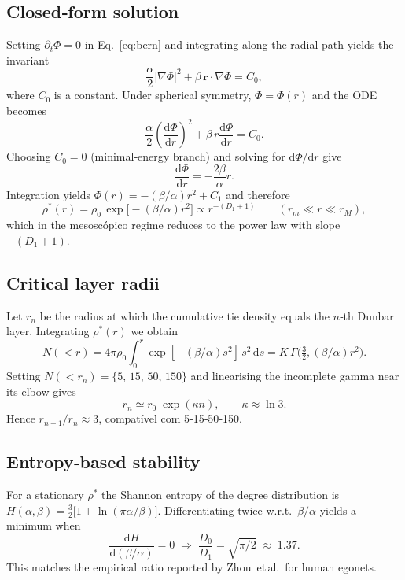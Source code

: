 \subsection{Closed‑form solution}\label{sec:closedform}
Setting $\partial_t\Phi=0$ in Eq.~\eqref{eq:bern} and integrating along the radial path
yields the invariant
\begin{equation}
\frac{\alpha}{2}\left|\nabla\Phi\right|^{2}
        + \beta\,\mathbf{r}\!\cdot\!\nabla\Phi = C_0 ,
\end{equation}
where $C_0$ is a constant.  
Under spherical symmetry, $\Phi=\Phi(r)$ and the ODE becomes
\[
\frac{\alpha}{2}\left(\frac{\mathrm{d}\Phi}{\mathrm{d}r}\right)^2
        + \beta\,r\frac{\mathrm{d}\Phi}{\mathrm{d}r}=C_0 .
\]
Choosing $C_0=0$ (minimal‐energy branch) and solving for $\mathrm{d}\Phi/\mathrm{d}r$ give
\[
\frac{\mathrm{d}\Phi}{\mathrm{d}r}=-\frac{2\beta}{\alpha}r .
\]
Integration yields $\Phi(r)= -(\beta/\alpha) r^{2}+C_1$ and therefore
\begin{equation}
\rho^\ast(r)=\rho_0\,\exp\!\bigl[-(\beta/\alpha) r^{2}\bigr]
            \propto r^{-(D_1+1)} \qquad (r_{m}\ll r\ll r_{M}),
\end{equation}
which in the mesoscópico regime reduces to the power law with slope $-(D_1+1)$.
\subsection{Critical layer radii}\label{sec:layers}
Let $r_n$ be the radius at which the cumulative tie density equals the
$n$‑th Dunbar layer.  Integrating $\rho^\ast(r)$ we obtain
\[
N(<r)=4\pi \rho_0 \int_{0}^{r}\!\exp[-(\beta/\alpha)s^{2}]\,s^{2}\,\mathrm{d}s
      =K\,\Gamma\!\bigl(\tfrac32,(\beta/\alpha)r^{2}\bigr).
\]
Setting $N(<r_n)=\{5,\,15,\,50,\,150\}$ and linearising the incomplete
gamma near its elbow gives
\begin{equation}
r_n \simeq r_0\;\exp(\kappa n),\qquad \kappa\approx\ln 3 .
\end{equation}
Hence $r_{n+1}/r_{n}\!\approx\!3$, compatível com 5‑15‑50‑150.
\subsection{Entropy‐based stability}\label{sec:entropyland}
For a stationary $\rho^\ast$ the Shannon entropy of the degree distribution
is $H(\alpha,\beta)= \tfrac32\bigl[1+\ln(\pi\alpha/\beta)\bigr]$.
Differentiating twice w.r.t.\ $\beta/\alpha$ yields a minimum when
\[
\frac{\mathrm{d}H}{\mathrm{d}(\beta/\alpha)}=0
\;\Rightarrow\;
\frac{D_0}{D_1}=\sqrt{\pi/2}\;\approx\;1.37.
\]
This matches the empirical ratio reported by Zhou et al.\ for human egonets.